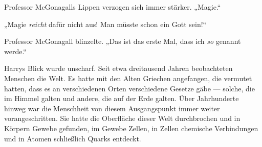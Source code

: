 Professor McGonagalls Lippen verzogen sich immer stärker.
„Magie.“

„Magie \emph{reicht} dafür nicht aus! Man müsste schon ein Gott sein!“

Professor McGonagall blinzelte.
„Das ist das erste Mal, dass ich \emph{so} genannt werde.“


Harrys Blick wurde unscharf. Seit etwa dreitausend Jahren beobachteten Menschen die Welt. Es hatte mit den Alten Griechen angefangen, die vermutet hatten, dass es an verschiedenen Orten verschiedene Gesetze gäbe — solche, die im Himmel galten und andere, die auf der Erde galten. Über Jahrhunderte hinweg war die Menschheit von diesem Ausgangspunkt immer weiter vorangeschritten. Sie hatte die Oberfläche dieser Welt durchbrochen und in Körpern Gewebe gefunden, im Gewebe Zellen, in Zellen chemische Verbindungen und in Atomen schließlich Quarks entdeckt.

